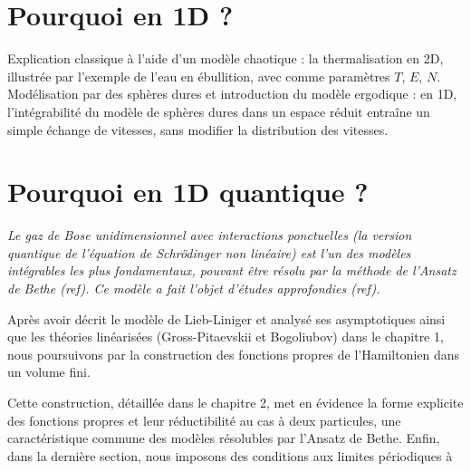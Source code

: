 \section*{Pourquoi en 1D ?}

{\em 

Explication classique à l’aide d’un modèle chaotique : la thermalisation en 2D, illustrée par l’exemple de l’eau en ébullition, avec comme paramètres \(T\), \(E\), \(N\). Modélisation par des sphères dures et introduction du modèle ergodique : en 1D, l’intégrabilité du modèle de sphères dures dans un espace réduit entraîne un simple échange de vitesses, sans modifier la distribution des vitesses.

}

\section*{Pourquoi en 1D quantique ?}

{\em 
Le gaz de Bose unidimensionnel avec interactions ponctuelles (la version quantique de l’équation de Schrödinger non linéaire) est l’un des modèles intégrables les plus fondamentaux, pouvant être résolu par la méthode de l’Ansatz de Bethe ({ref}). Ce modèle a fait l’objet d’études approfondies ({ref}).  

Après avoir décrit le modèle de Lieb-Liniger et analysé ses asymptotiques ainsi que les théories linéarisées (Gross-Pitaevskii et Bogoliubov) dans le chapitre 1, nous poursuivons par la construction des fonctions propres de l’Hamiltonien dans un volume fini.  

Cette construction, détaillée dans le chapitre 2, met en évidence la forme explicite des fonctions propres et leur réductibilité au cas à deux particules, une caractéristique commune des modèles résolubles par l’Ansatz de Bethe. Enfin, dans la dernière section, nous imposons des conditions aux limites périodiques à %
}  
